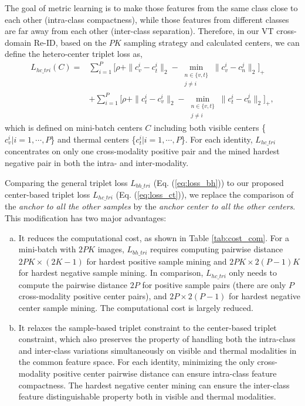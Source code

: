 \documentclass[journal]{IEEEtran}
\begin{document}
The goal of metric learning is to make those features from the same class close to each other (intra-class compactness), while those features from different classes are far away from each other (inter-class separation). Therefore, in our VT cross-domain Re-ID, based on the $PK$ sampling strategy and calculated centers, we can define the hetero-center triplet loss as,
\begin{align}\label{eq:loss_ct}
    L_{hc\_tri}(C) = & \sum\limits_{i=1}^{P}\Big[\rho  +  \|c^i_v - c^i_t\|_2  - \min\limits_{\substack{ n \in \{v, t\} \\ j \neq i}}  \| c^i_v - c^j_n \| _2 \Big]_+  \\
    & + \sum\limits_{i=1}^{P}\Big[\rho  +  \|c^i_t - c^i_v\|_2  - \min\limits_{\substack{ n \in \{v, t\} \\ j \neq i}}  \| c^i_t - c^j_n \| _2 \Big]_+,\nonumber
\end{align}
which is defined on mini-batch centers $C$ including both visible centers \{$c_{v}^{i}| i=1,\cdots,P$\} and thermal centers \{$c_{t}^{i}| i=1,\cdots,P$\}.
For each identity, $L_{hc\_tri}$ concentrates on only one cross-modality positive pair and the mined hardest negative pair in both the intra- and inter-modality.

Comparing the general triplet loss $L_{bh\_tri}$ (Eq. (\ref{eq:loss_bh})) to our proposed center-based triplet loss $L_{hc\_tri}$ (Eq. (\ref{eq:loss_ct})), we replace the comparison of the \emph{anchor to all the other samples} by the \emph{anchor center to all the other centers}. This modification has two major advantages:
\begin{enumerate}[a)]
  \item It reduces the computational cost, as shown in Table \ref{tab:cost_com}. For a mini-batch with $2PK$ images, $L_{bh\_tri}$ requires computing pairwise distance $2PK \times (2K-1)$ for hardest positive sample mining and $2PK \times 2(P-1)K$ for hardest negative sample mining. In comparison, $L_{hc\_tri}$ only needs to compute the pairwise distance $2P$ for positive sample pairs (there are only $P$ cross-modality positive center pairs), and $2P \times 2(P-1)$ for hardest negative center sample mining. The computational cost is largely reduced.
  \item It relaxes the sample-based triplet constraint to the center-based triplet constraint, which also preserves the property of handling both the intra-class and inter-class variations simultaneously on visible and thermal modalities in the common feature space. For each identity, minimizing the only cross-modality positive center pairwise distance can ensure intra-class feature compactness. The hardest negative center mining can ensure the inter-class feature distinguishable property both in visible and thermal modalities.
\end{enumerate}
\end{document}
